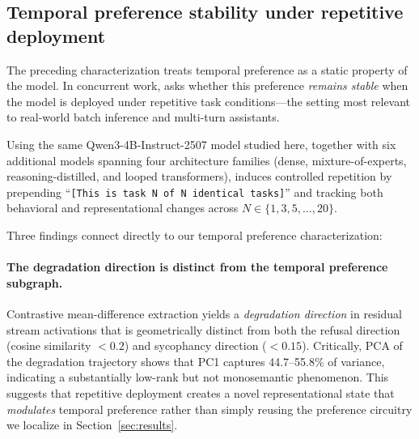 
\subsection{Temporal preference stability under repetitive deployment}\label{sec:temporal-stability}

The preceding characterization treats temporal preference as a static property of the model.
In concurrent work, \citet{molofsky2026patience} asks whether this preference \emph{remains stable} when the model is deployed under repetitive task conditions---the setting most relevant to real-world batch inference and multi-turn assistants.

Using the same Qwen3-4B-Instruct-2507 model studied here, together with six additional models spanning four architecture families (dense, mixture-of-experts, reasoning-distilled, and looped transformers), \citet{molofsky2026patience} induces controlled repetition by prepending ``\texttt{[This is task N of N identical tasks]}'' and tracking both behavioral and representational changes across $N \in \{1, 3, 5, \ldots, 20\}$.

Three findings connect directly to our temporal preference characterization:

\paragraph{The degradation direction is distinct from the temporal preference subgraph.}
Contrastive mean-difference extraction yields a \emph{degradation direction} in residual stream activations that is geometrically distinct from both the refusal direction (cosine similarity $< 0.2$) and sycophancy direction ($< 0.15$).
Critically, PCA of the degradation trajectory shows that PC1 captures 44.7--55.8\% of variance, indicating a substantially low-rank but not monosemantic phenomenon.
This suggests that repetitive deployment creates a novel representational state that \emph{modulates} temporal preference rather than simply reusing the preference circuitry we localize in Section~\ref{sec:results}.


